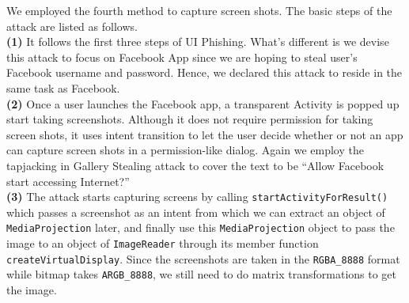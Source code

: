 \documentclass[letterpaper,12pt]{article}
\begin{document}
We employed the fourth method to capture screen shots. The basic steps
of the attack are listed as follows.\\ \textbf{(1)} It follows the
first three steps of UI Phishing. What's different is we devise this
attack to focus on Facebook App since we are hoping to steal user's
Facebook username and password. Hence, we declared this attack to
reside in the same task as Facebook.\\ \textbf{(2)} Once a user launches
the Facebook app, a transparent Activity is popped up start taking
screenshots. Although it does not require permission for taking screen
shots, it uses intent transition to let the user decide whether or not
an app can capture screen shots in a permission-like dialog. Again we
employ the tapjacking in Gallery Stealing attack to cover the text to
be ``Allow Facebook start accessing Internet?'' \\ \textbf{(3)} The
attack starts capturing screens by calling
\texttt{startActivityForResult()} which passes a screenshot as an
intent from which we can extract an object of\\ \texttt{MediaProjection}
later, and finally use this \texttt{MediaProjection} object to pass
the image to an object of \texttt{ImageReader} through its member
function\\ \texttt{createVirtualDisplay}. Since the screenshots are
taken in the \texttt{RGBA\_8888} format while bitmap takes
\texttt{ARGB\_8888}, we still need to do matrix transformations to
get the image.
\end{document}
